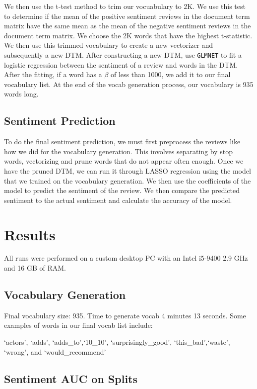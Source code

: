 \documentclass{article}
\begin{document}
We then use the t-test method to trim our vocuabulary to 2K. We use this test to
determine if the mean of the positive sentiment reviews in the document term
matrix have the same mean as the mean of the negative sentiment reviews in the
document term matrix. We choose the 2K words that have the highest t-statistic. We then use this trimmed vocabulary to create a new vectorizer and subsequently a new DTM. After constructing a new DTM, use \verb,GLMNET, to fit a logistic regression between the sentiment of a review and words in the DTM. After the fitting, if a word has a $\beta$ of less than 1000, we add it to our final vocabulary list. At the end of the vocab generation process, our vocabulary is 935 words long. 

\subsection{Sentiment Prediction}

To do the final sentiment prediction, we must first preprocess the reviews like how we did for the vocabulary generation. This involves separating by stop words, vectorizing and prune words that do not appear often enough. Once we have the pruned DTM, we can run it through LASSO regression using the model that we trained on the vocabulary generation. We then use the coefficients of the model to predict the sentiment of the review. We then compare the predicted sentiment to the actual sentiment and calculate the accuracy of the model.

\section{Results}

All runs were performed on a custom desktop PC with an Intel i5-9400 2.9 GHz and 16 GB of RAM. 

\subsection{Vocabulary Generation}

Final vocabulary size: 935. Time to generate vocab 4 minutes 13 seconds. Some examples of words in our final vocab list include: 

`actors', `adds', `adds\_to',`10\_10', `surprisingly\_good', `this\_bad',`waste',
`wrong', and `would\_recommend'


\subsection{Sentiment AUC on Splits}
\end{document}
